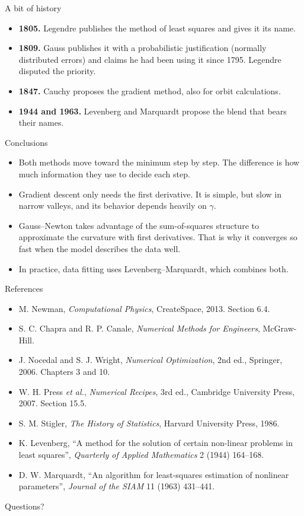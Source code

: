 \documentclass[aspectratio=169,10pt]{beamer}
\begin{document}
\begin{frame}{A bit of history}
  \begin{itemize}
    \item \textbf{1805.} Legendre publishes the method of least squares and gives it its name.
    \item \textbf{1809.} Gauss publishes it with a probabilistic justification (normally distributed errors) and claims he had been using it since 1795. Legendre disputed the priority.
    \item \textbf{1847.} Cauchy proposes the gradient method, also for orbit calculations.
    \item \textbf{1944 and 1963.} Levenberg and Marquardt propose the blend that bears their names.
  \end{itemize}
\end{frame}

\begin{frame}{Conclusions}
  \begin{itemize}
    \item Both methods move toward the minimum step by step. The difference is how much information they use to decide each step.
    \item Gradient descent only needs the first derivative. It is simple, but slow in narrow valleys, and its behavior depends heavily on $\gamma$.
    \item Gauss--Newton takes advantage of the sum-of-squares structure to approximate the curvature with first derivatives. That is why it converges so fast when the model describes the data well.
    \item In practice, data fitting uses Levenberg--Marquardt, which combines both.
  \end{itemize}
\end{frame}

\begin{frame}{References}
  \small
  \begin{itemize}
    \item M. Newman, \emph{Computational Physics}, CreateSpace, 2013. Section 6.4.
    \item S. C. Chapra and R. P. Canale, \emph{Numerical Methods for Engineers}, McGraw-Hill.
    \item J. Nocedal and S. J. Wright, \emph{Numerical Optimization}, 2nd ed., Springer, 2006. Chapters 3 and 10.
    \item W. H. Press \emph{et al.}, \emph{Numerical Recipes}, 3rd ed., Cambridge University Press, 2007. Section 15.5.
    \item S. M. Stigler, \emph{The History of Statistics}, Harvard University Press, 1986.
    \item K. Levenberg, ``A method for the solution of certain non-linear problems in least squares'', \emph{Quarterly of Applied Mathematics} 2 (1944) 164--168.
    \item D. W. Marquardt, ``An algorithm for least-squares estimation of nonlinear parameters'', \emph{Journal of the SIAM} 11 (1963) 431--441.
  \end{itemize}
\end{frame}

\begin{frame}[standout]
  Questions?
\end{frame}
\end{document}
